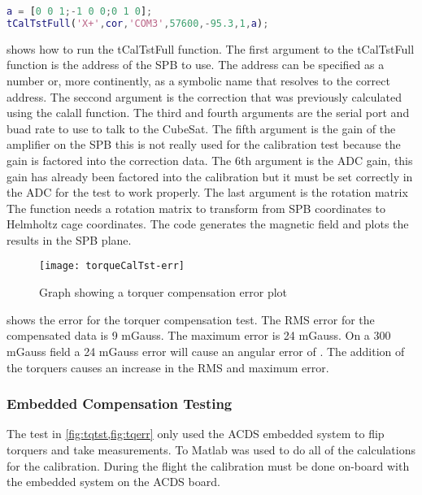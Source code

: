 \begin{lstlisting}[caption={Running torquer compensation test for the X+ \ac{SPB}},label={lst:tCalTst},language=Matlab]
a = [0 0 1;-1 0 0;0 1 0];
tCalTstFull('X+',cor,'COM3',57600,-95.3,1,a);
\end{lstlisting}

 shows how to run the tCalTstFull function. The first argument to the tCalTstFull function is the address of the \ac{SPB} to use. The address can be specified as a number or, more continently, as a symbolic name that resolves to the correct address. The seccond argument is the correction that was previously calculated using the calall function. The third and fourth arguments are the serial port and buad rate to use to talk to the CubeSat. The fifth argument is the gain of the amplifier on the \ac{SPB} this is not really used for the calibration test because the gain is factored into the correction data. The 6th argument is the \ac{ADC} gain, this gain has already been factored into the calibration but it must be set correctly in the \ac{ADC} for the test to work properly. The last argument is the rotation matrix  The function needs a rotation matrix to transform from \ac{SPB} coordinates to Helmholtz cage coordinates. The code generates the magnetic field and plots the results in the \ac{SPB} plane.

\begin{figure}[!ht]
    \centering
    \texttt{[image: torqueCalTst-err]}
    \caption{Graph showing a torquer compensation error plot}
    \label{fig:tqerr}
\end{figure}

 shows the error for the torquer compensation test. The RMS error for the compensated data is 9 mGauss. The maximum error is 24 mGauss. On a 300 mGauss field a 24 mGauss error will cause an angular error of \textdegree. The addition of the torquers causes an increase in the RMS and maximum error.


\subsubsection{Embedded Compensation Testing}

The test in \cref{fig:tqtst,fig:tqerr} only used the \ac{ACDS} embedded system to flip torquers and take measurements. To Matlab was used to do all of the calculations for the calibration. During the flight the calibration must be done on-board with the embedded system on the \ac{ACDS} board.

